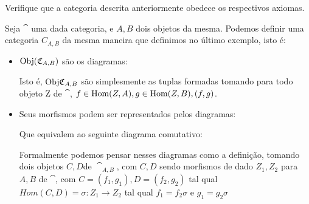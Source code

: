 \documentclass[../main]{subfiles}
\begin{document}
\begin{exercise}
    Verifique que a categoria descrita anteriormente obedece os respectivos
    axiomas.
\end{exercise}
\begin{example}
    Seja \(\cat\) uma dada categoria, e \(A, B\) dois objetos da mesma. Podemos
    definir uma categoria \(C_{A, B}\) da mesma maneira que definimos no último
    exemplo, isto é:
    \begin{itemize}
        \item \(\text{Obj}(\mathfrak{C}_{A, B})\) são os diagramas:
        \begin{center}
        \end{center}

        Isto é, \(\text{Obj} \mathfrak{C}_{A, B}\) são simplesmente as tuplas formadas tomando
        para todo objeto Z de \(\cat\), \(f \in \text{Hom}(Z, A), g \in \text{Hom}(Z, B),
        (f, g)\).
        \item Seus morfismos podem ser representados pelos diagramas:
        \begin{center}
        \end{center}
        Que equivalem ao seguinte diagrama comutativo:
        \begin{center}
        \end{center}
        Formalmente podemos pensar nesses diagramas como a definição, tomando
        dois objetos \(C, D\)de \(\cat_{A, B}\), com \(C, D\) sendo morfismos de
        dado \(Z_1, Z_2\) para \(A, B\) de \(\cat\), com \(C = (f_1, g_1), D =
        (f_2, g_2)\) tal qual \(Hom(C, D) = \sigma: Z_1 \to Z_2\) tal qual \(f_1
        = f_2\sigma\) e \(g_1 = g_2 \sigma\) 
    \end{itemize}
\end{example}
\end{document}
